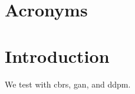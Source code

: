 \documentclass{article}
\begin{document}
\glsaddall  %

\section*{Acronyms}
\printglossary[type=\acronymtype, title=Acronyms]

\section{Introduction}
We test with \gls{cbrs}, \gls{gan}, and \gls{ddpm}.
\end{document}
